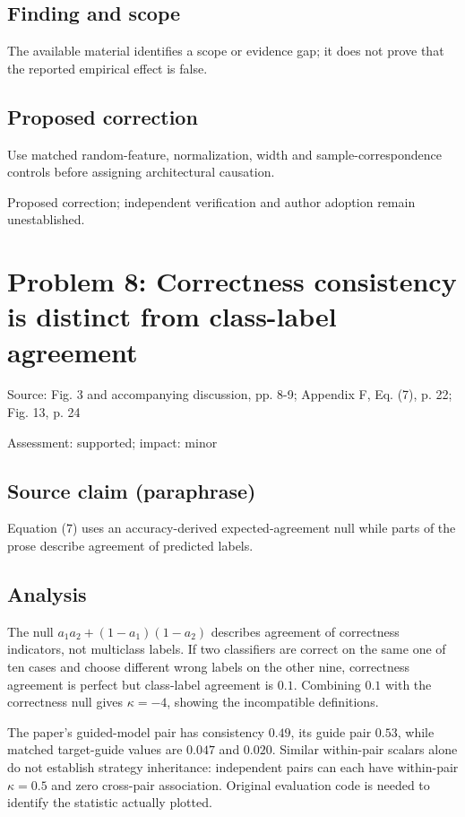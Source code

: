 \documentclass[11pt]{article}
\begin{document}
\subsection*{Finding and scope}

The available material identifies a scope or evidence gap; it does not prove that the reported empirical effect is false.

\subsection*{Proposed correction}

Use matched random-feature, normalization, width and sample-correspondence controls before assigning architectural causation.

Proposed correction; independent verification and author adoption remain unestablished.

\section*{Problem 8: Correctness consistency is distinct from class-label agreement}

Source: Fig. 3 and accompanying discussion, pp. 8-9; Appendix F, Eq. (7), p. 22; Fig. 13, p. 24

Assessment: supported; impact: minor

\subsection*{Source claim (paraphrase)}

Equation (\(7\)) uses an accuracy-derived expected-agreement null while parts of the prose describe agreement of predicted labels.

\subsection*{Analysis}

The null \(a_1a_2+(1-a_1)(1-a_2)\) describes agreement of correctness indicators, not multiclass labels. If two classifiers are correct on the same one of ten cases and choose different wrong labels on the other nine, correctness agreement is perfect but class-label agreement is \(0.1\). Combining \(0.1\) with the correctness null gives \(\kappa=-4\), showing the incompatible definitions.

The paper's guided-model pair has consistency \(0.49\), its guide pair \(0.53\), while matched target-guide values are \(0.047\) and \(0.020\). Similar within-pair scalars alone do not establish strategy inheritance: independent pairs can each have within-pair \(\kappa=0.5\) and zero cross-pair association. Original evaluation code is needed to identify the statistic actually plotted.
\end{document}
